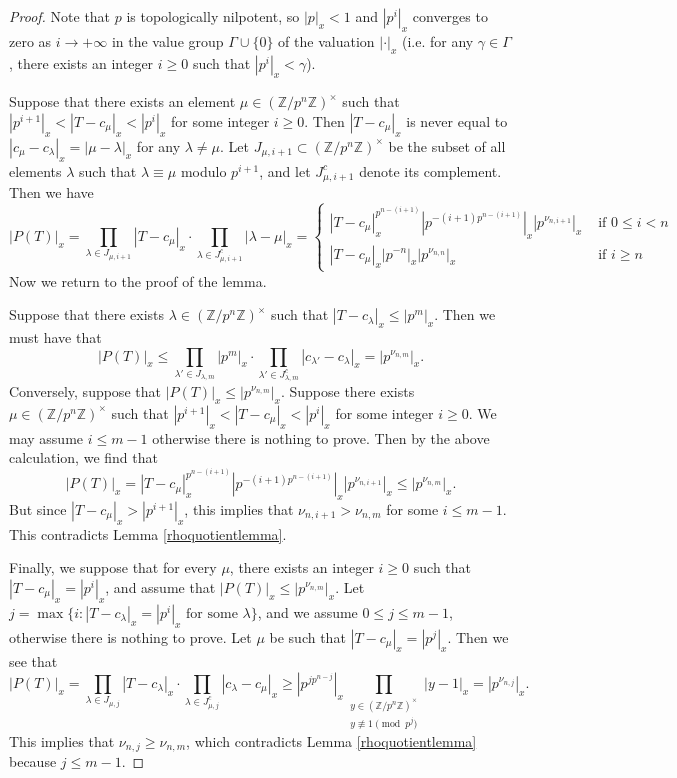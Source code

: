 \documentclass[10pt, oneside]{amsart}
\numberwithin{equation}{subsection}
\theoremstyle{definition}
\theoremstyle{remark}
\newcommand{\mbb}[1]{\mathbb{#1}}
\newcommand{\opn}[1]{\operatorname{#1}}
\begin{document}
\begin{proof}
Note that $p$ is topologically nilpotent, so $|p|_x < 1$ and $|p^i|_x$ converges to zero as $i \to +\infty$ in the value group $\Gamma \cup \{0\}$ of the valuation $|\cdot|_x$ (i.e. for any $\gamma \in \Gamma$, there exists an integer $i \geq 0$ such that $|p^i|_x < \gamma$). 

Suppose that there exists an element $\mu \in \left(\mbb{Z}/p^n \mbb{Z} \right)^{\times}$ such that $|p^{i+1}|_x < |T - c_{\mu}|_x < |p^{i}|_x$ for some integer $i \geq 0$. Then $|T - c_{\mu}|_x$ is never equal to $|c_{\mu} - c_{\lambda}|_x = |\mu - \lambda|_x$ for any $\lambda \neq \mu$. Let $J_{\mu, i+1} \subset \left(\mbb{Z}/p^n \mbb{Z} \right)^{\times}$ be the subset of all elements $\lambda$ such that $\lambda \equiv \mu$ modulo $p^{i+1}$, and let $J_{\mu, i+1}^c$ denote its complement. Then we have
\[
|P(T)|_x = \prod_{\lambda \in J_{\mu, i+1}} |T-c_{\mu}|_x \cdot \prod_{\lambda \in J_{\mu, i+1}^c} | \lambda - \mu |_x = \left\{ \begin{array}{cc} |T- c_{\mu}|_x^{p^{n-(i+1)}} |p^{-(i+1)p^{n-(i+1)}}|_x |p^{\nu_{n, i+1}}|_x & \text{ if } 0 \leq i < n \\ |T-c_{\mu}|_x |p^{-n}|_x |p^{\nu_{n, n}}|_x & \text{ if } i \geq n \end{array} \right.
\]
Now we return to the proof of the lemma. 

Suppose that there exists $\lambda \in \left(\mbb{Z}/p^n \mbb{Z} \right)^{\times}$ such that $|T - c_{\lambda}|_x \leq |p^{m}|_x$. Then we must have that
\[
|P(T)|_x \leq \prod_{\lambda' \in J_{\lambda, m}} |p^{m}|_x \cdot \prod_{\lambda' \in J_{\lambda, m}^c} |c_{\lambda'} - c_{\lambda}|_x = |p^{\nu_{n, m}}|_x .
\]
Conversely, suppose that $|P(T)|_x \leq |p^{\nu_{n, m}}|_x$. Suppose there exists $\mu \in \left(\mbb{Z}/p^n \mbb{Z} \right)^{\times}$ such that $|p^{i+1}|_x < |T - c_{\mu}|_x < |p^{i}|_x$ for some integer $i \geq 0$. We may assume $i \leq m-1$ otherwise there is nothing to prove. Then by the above calculation, we find that
\[
|P(T)|_x = |T - c_{\mu}|_x^{p^{n-(i+1)}} |p^{-(i+1)p^{n-(i+1)}}|_x |p^{\nu_{n, i+1}}|_x \leq |p^{\nu_{n, m}}|_x. 
\]
But since $|T - c_{\mu}|_x > |p^{i+1}|_x$, this implies that $\nu_{n, i+1} > \nu_{n, m}$ for some $i \leq m-1$. This contradicts Lemma \ref{rhoquotientlemma}.

Finally, we suppose that for every $\mu$, there exists an integer $i \geq 0$ such that $|T - c_{\mu}|_x = |p^{i}|_x$, and assume that $|P(T)|_x \leq |p^{\nu_{n, m}}|_x$. Let $j = \opn{max}\{ i : |T - c_{\lambda}|_x = |p^{i}|_x \text{ for some } \lambda \}$, and we assume $0 \leq j \leq m-1$, otherwise there is nothing to prove. Let $\mu$ be such that $|T - c_{\mu}|_x = |p^{j}|_x$. Then we see that
\[
|P(T)|_x = \prod_{\lambda \in J_{\mu, j}} |T - c_{\lambda}|_x \cdot \prod_{\lambda \in J_{\mu, j}^c} |c_{\lambda} - c_{\mu}|_x \geq |p^{jp^{n-j}}|_x \prod_{\substack{y \in \left(\mbb{Z}/p^n \mbb{Z}\right)^{\times} \\ y \not\equiv 1 \pmod{{p^j}}}} | y - 1 |_x = |p^{\nu_{n, j}}|_x .
\]
This implies that $\nu_{n, j} \geq \nu_{n, m}$, which contradicts Lemma \ref{rhoquotientlemma} because $j \leq m-1$.
\end{proof}
\end{document}
